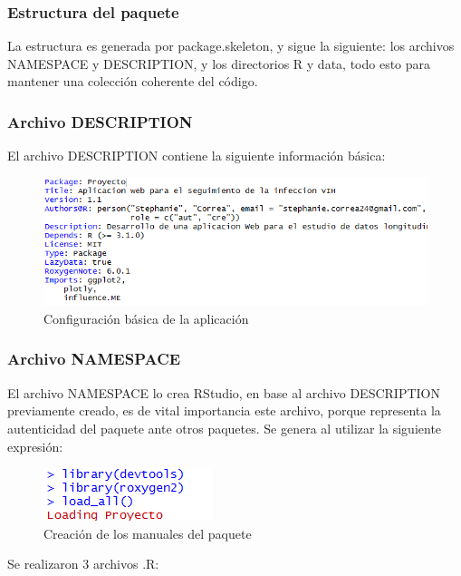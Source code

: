\subsubsection{Estructura del paquete}

La estructura es generada por package.skeleton, y sigue la siguiente: los archivos NAMESPACE y DESCRIPTION, y los directorios R y data, todo esto para mantener una colecci\'on coherente del c\'odigo.

\subsubsection{Archivo DESCRIPTION}

El archivo DESCRIPTION contiene la siguiente informaci\'on b\'asica:

\begin{figure}[H]
\centering
\includegraphics[scale=1]{description.PNG}
\caption{Configuraci\'on b\'asica de la aplicaci\'on }
\end{figure}

\subsubsection{Archivo NAMESPACE}

El archivo NAMESPACE lo crea RStudio, en base al archivo DESCRIPTION previamente creado, es de vital importancia este archivo, porque representa la autenticidad del paquete ante otros paquetes. Se genera al utilizar la siguiente expresi\'on:

\begin{figure}[H]
 \centering
 \includegraphics[scale=1]{creacion.png}
 \caption{Creaci\'on de los manuales del paquete}
 \end{figure}
  
 Se realizaron 3 archivos .R:

